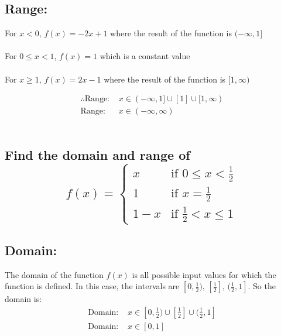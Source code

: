 \documentclass{article}
\begin{document}
\subsection*{Range: }
For $x < 0 \text{, } f(x) = -2x + 1$ where the result of the function is $(-\infty, 1]$
\\ \\
For $0 \leq x < 1$, $f(x) = 1$ which is a constant value \\ \\ 
For ${x \geq 1}$, $f(x) = 2x - 1$ where the result of the function is $[1, \infty)$

\begin{align*}
	\therefore \text{Range: } & x \in (-\infty, 1] \cup [1] \cup [1, \infty) \\
	\text{Range: }            & x \in (-\infty, \infty)
\end{align*}
\\

\newpage
\subsection{Find the domain and range of \[
	f(x) = \begin{cases}
		x 		& \text{if } 0 \leq x < \frac{1}{2} \\ 
		1		& \text{if } x = \frac{1}{2}\\ 
		1-x 	& \text{if } \frac{1}{2} < x \leq 1
	\end{cases}
	\]}

\subsection*{Domain: }
The domain of the function $f(x)$ is all possible input values for which the function is defined. In this case, the intervals are $[0, \frac{1}{2}) \text{, } [\frac{1}{2}] \text{, } (\frac{1}{2}, 1]$. So the domain is:
\begin{align*}
	\text{Domain: } & x \in [0, \frac{1}{2}) \cup [\frac{1}{2}] \cup (\frac{1}{2}, 1]\\
	\text{Domain: } & x \in [0, 1]
\end{align*}
\end{document}
